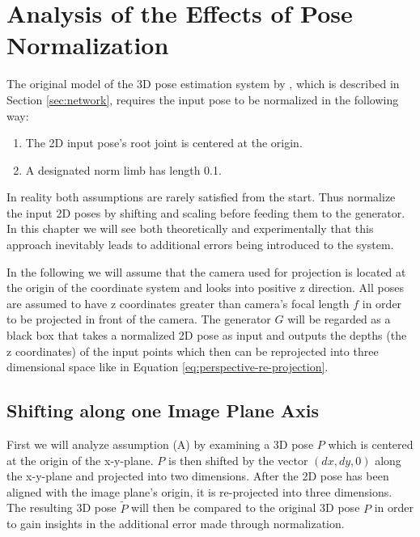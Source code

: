 \section{Analysis of the Effects of Pose Normalization}
\label{sec:effects-of-normalization}

The original model of the 3D pose estimation system by \citet{drover18}, which is described in Section \ref{sec:network}, requires the input pose to be normalized in the following way:
\begin{enumerate}[label=(\Alph*)]
	\item The 2D input pose's root joint is centered at the origin.
	\item A designated norm limb has length 0.1.
\end{enumerate}

In reality both assumptions are rarely satisfied from the start.
Thus \citet{drover18} normalize the input 2D poses by shifting and scaling before feeding them to the generator.
In this chapter we will see both theoretically and experimentally that this approach inevitably leads to additional errors being introduced to the system.


In the following we will assume that the camera used for projection is located at the origin of the coordinate system and looks into positive z direction.
All poses are assumed to have z coordinates greater than camera's focal length $f$ in order to be projected in front of the camera.
The generator $G$ will be regarded as a black box that takes a normalized 2D pose as input and outputs the depths (the z coordinates) of the input points which then can be reprojected into three dimensional space like in Equation \eqref{eq:perspective-re-projection}.


\subsection{Shifting along one Image Plane Axis}
\label{sec:x-shift-error}
First we will analyze assumption (A) by examining a 3D pose $P$ which is centered at the origin of the x-y-plane.
$P$ is then shifted by the vector $(dx, dy, 0)$ along the x-y-plane and projected into two dimensions.
After the 2D pose has been aligned with the image plane's origin, it is re-projected into three dimensions.
The resulting 3D pose $\widetilde{P}$ will then be compared to the original 3D pose $P$ in order to gain insights in the additional error made through normalization.

